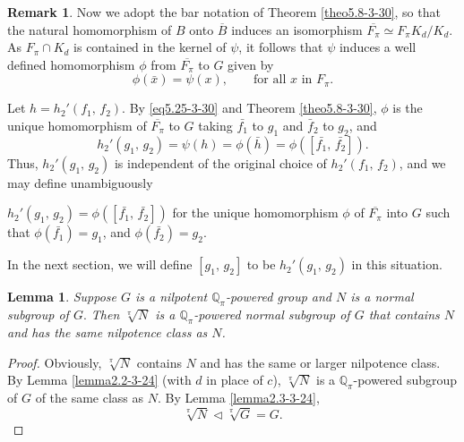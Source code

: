 \documentclass[mathscr]{amsart}
\theoremstyle{theorem}
\newtheorem{lemma}[theorem]{Lemma}
\theoremstyle{definition}
\newtheorem{remark}[theorem]{Remark}
\numberwithin{equation}{section}
\def \({\left(}
\def \){\right)}
\def\Q{\mathbb{Q}}
\def \Exp{\text{Exp}\,}
\begin{document}
\begin{remark}
Now we adopt the bar notation of Theorem \ref{theo5.8-3-30}, so that
the natural homomorphism of $B$ onto $\overline B$ induces an
isomorphism $\overline {F_\pi}\simeq F_\pi K_d/K_d$.  As $F_\pi\cap
K_d$ is contained in the kernel of $\psi$, it follows that $\psi$
induces a well defined homomorphism $\phi$ from $\overline{F_\pi}$
to $G$ given by
$$
\phi\(\bar x\)=\psi(x),\qquad\text{for all }x\text{ in }F_\pi.
$$

Let $h=h_2'\(f_1,\,f_2\)$.  By \eqref{eq5.25-3-30} and Theorem
\ref{theo5.8-3-30}, $\phi$ is the unique homomorphism of
$\overline{F_\pi}$ to $G$ taking $\bar{f_1}$ to $g_1$ and $\bar f_2$
to $g_2$, and
$$
h_2'\(g_1,\,g_2\)=\psi(h)=\phi\(\bar
h\)=\phi\(\left[\bar{f_1},\,\bar{f_2}\right]\).
$$
Thus, $h_2'\(g_1,\,g_2\)$ is independent of the original choice of
$h_2'\(f_1,\,f_2\)$, and we may define unambiguously

\bigskip\qquad
$h_2'\(g_1,\,g_2\)=\phi\(\left[\bar{f_1},\,\bar{f_2}\right]\)$ for
the unique homomorphism $\phi$ of $\overline{F_\pi}$ into $G$ such
that $\phi\(\bar{f_1}\)=g_1$, and
$\phi\(\bar{f_2}\)=g_2$.\vspace{-1.02cm}
\begin{equation}\label{eq5.26-3-30}
\end{equation}
\end{remark}

\bigskip In the next section, we will define $\left[g_1,\,g_2\right]$
to be $h_2'\(g_1,\,g_2\)$ in this situation.

\begin{lemma}\label{lemma5.10}
Suppose $G$ is a nilpotent $\Q_\pi$-powered group and $N$ is a
normal subgroup of $G.$ Then $\sqrt[\pi]{N}$ is a $\Q_\pi$-powered
normal subgroup of $G$ that contains $N$ and has the same nilpotence
class as $N$.
\end{lemma}

\begin{proof}
Obviously, $\sqrt[\pi]{N}$ contains $N$ and has the same or larger
nilpotence class. By Lemma \ref{lemma2.2-3-24} (with $d$ in place of
$c$), $\sqrt[\pi]{N}$ is a $\Q_\pi$-powered subgroup of $G$ of the
same class as $N$. By Lemma \ref{lemma2.3-3-24},
$$\sqrt[\pi]{N}\lhd\sqrt[\pi]{G}=G.$$
\end{proof}
\end{document}
